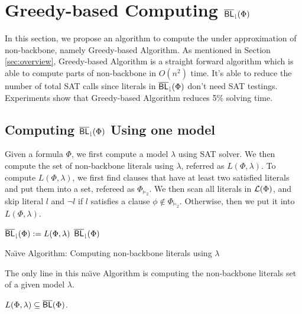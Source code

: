 \section{Greedy-based Computing ${\sf \overline{BL}_\downharpoonright}(\Phi)$} \label{sec:greedy}
In this section, we propose an algorithm to compute the under approximation of non-backbone, namely Greedy-based Algorithm. As mentioned in Section \ref{sec:overview}, Greedy-based Algorithm is a straight forward algorithm which is able to compute parts of non-backbone in $O(n^2)$ time. It's able to reduce the number of total SAT calls since literals in ${\sf \overline{BL}_\downharpoonright}(\Phi)$ don't need SAT testings. Experiments show that Greedy-based Algorithm reduces 5\% solving time.

\subsection{Computing ${\sf \overline{BL}_\downharpoonright}(\Phi)$ Using one model}

Given a formula $\Phi$, we first compute a model $\lambda$ using SAT solver. We then compute the set of non-backbone literals using $\lambda$, referred as $L(\Phi,\lambda)$.
To compute $L(\Phi,\lambda)$, we first find clauses that have at least two satisfied literals and put them into a set, refereed as $\Phi_{\models_2}$. We then scan all literals in $\Lit(\Phi)$, and skip literal $l$ and $\neg l$ if $l$ satisfies a clause $\phi\notin\Phi_{\models_2}$. Otherwise, then we put it into $L(\Phi,\lambda)$.

\begin{algorithm2e}
\SetAlgoShortEnd
\SetFillComment
{}
${\sf \overline{BL}_\downharpoonright}(\Phi):=L(\Phi,\lambda)$\;
\Return ${\sf \overline{BL}_\downharpoonright}(\Phi)$\;
\caption{Na\"{\i}ve Algorithm: Computing non-backbone literals using $\lambda$}
\label{alg:greedy}
\end{algorithm2e}

The only line in this na\"{\i}ve Algorithm is computing the non-backbone literals set of a given model $\lambda$.

\begin{theorem} \label{lem:navie}
 $L(\Phi,\lambda)\subseteq\overline{\textsf{BL}}(\Phi)$.
\end{theorem}

